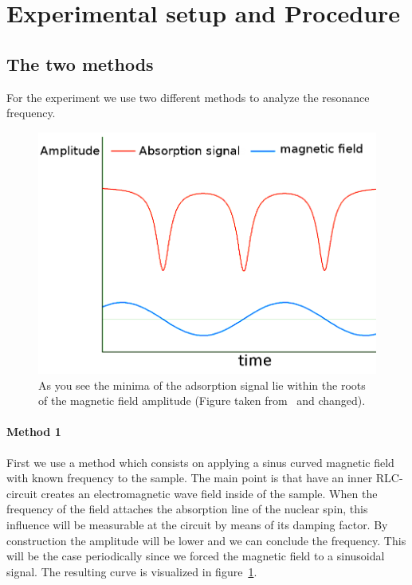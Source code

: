 \section{Experimental setup and Procedure}
\subsection{The two methods}
For the experiment we use two different methods to analyze the
resonance frequency.
\begin{figure}[htpb]
    \centering
    \includegraphics[width=0.7\linewidth]{figures/method1}
    \caption{As you see the minima of the adsorption signal lie within
        the roots of the magnetic field amplitude (Figure
            taken from~\cite{versuchsanleitung} and changed).}
    \label{fig:method1}
\end{figure}
\paragraph{Method 1} First we use a method which consists on applying a 
sinus curved magnetic field with known frequency to the sample. 
The main point is that have an inner RLC-circuit creates an electromagnetic
wave field inside of the sample. When the frequency of the field attaches
the absorption line of the nuclear spin, this influence will be measurable
at the circuit by means of its damping factor. By construction the 
amplitude will be lower and we can conclude the frequency. This will
be the case periodically since we forced the magnetic field to a 
sinusoidal signal. The resulting curve is visualized 
in figure~\ref{fig:method1}. \\\\
